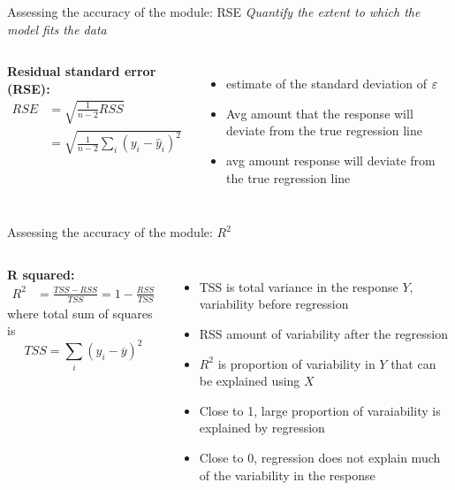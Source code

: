 \documentclass[aspectratio=169,usenames,dvipsnames]{beamer}
\newcommand{\InstructorNotes}[1]{\textit{\color{orange}#1}}
\newcommand{\InstructorList}[1]{
\begin{itemize}
	\color{orange}
	#1
\end{itemize}
}
\begin{document}
\begin{frame}[c]{Assessing the accuracy of the module: RSE}
	\centering
\InstructorNotes{Quantify the extent to which the model fits the data}
\begin{columns}
\textbf{Residual standard error (RSE):}
\begin{align*}
	RSE &= \sqrt{ \frac{1}{n-2} RSS}\\
	& = \sqrt{ \frac{1}{n-2} \sum_i (y_i - \hat y_i)^2}
\end{align*}

\InstructorList{
\item estimate of the standard deviation of $\varepsilon$
\item Avg amount that the response will deviate from the true regression line 
\item  avg amount response will deviate from the true regression line}
\end{columns}

\end{frame}
\begin{frame}[c]{Assessing the accuracy of the module: $R^2$}
	\centering
\begin{columns}
\textbf{R squared:}
\begin{align*}
	R^2 &= \frac{TSS-RSS}{TSS} = 1-\frac{RSS}{TSS}
\end{align*}
where total sum of squares is
\begin{equation*}
	TSS = \sum_i (y_i - \overline y)^2
\end{equation*}
\InstructorList{
\item TSS is total variance in the response $Y$, variability before regression
\item RSS amount of variability after the regression
\item $R^2$ is proportion of variability in $Y$ that can be explained using $X$
\item Close to 1, large proportion of varaiability is explained by regression
\item Close to 0, regression does not explain much of the variability in the response
}
\end{columns}

\end{frame}
\end{document}
